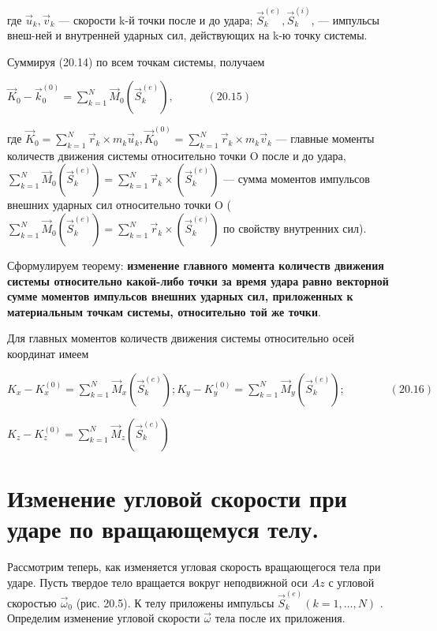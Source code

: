 {\begin{center}
\par где $\vec{u}_k, \vec{v}_k$  — скорости k-й точки после и до удара; $\vec{S}_k^{(e)}, \vec{S}_k^{(i)}$,  — импульсы внеш-ней и внутренней ударных сил, действующих на k-ю точку системы.

\par Суммируя (20.14) по всем точкам системы, получаем

\par $\vec{K}_0 - \vec{k}_0^{(0)} = \sum\limits_{k=1}^N \vec{M}_0 (\vec{S}_k^{(e)}), \quad\quad\quad (20.15)$

\par где $\vec{K}_0 = \sum\limits_{k=1}^N \vec{r}_k \times m_k \vec{u}_k, \vec{K}_0^{(0)} = \sum\limits_{k=1}^N \vec{r}_k \times m_k \vec{v}_k$ — главные моменты количеств движения системы  относительно  точки  O  после  и  до  удара, $\sum\limits_{k=1}^N \vec{M}_0 (\vec{S}_k^{(e)}) = \sum\limits_{k=1}^N \vec{r}_k \times (\vec{S}_k^{(e)})$ —  сумма  моментов  импульсов  внешних  ударных  сил  относительно  точки  O  ( $\sum\limits_{k=1}^N \vec{M}_0 (\vec{S}_k^{(e)}) = \sum\limits_{k=1}^N \vec{r}_k \times (\vec{S}_k^{(e)})$ по свойству внутренних сил).

\par Сформулируем теорему: \textbf{изменение главного момента количеств движения системы относительно какой-либо точки за время удара равно векторной сумме моментов импульсов внешних ударных сил, приложенных к материальным точкам системы, относительно той же точки}.

\par Для главных моментов количеств движения системы относительно осей координат имеем

\par $K_x - K_x^{(0)} = \sum\limits_{k=1}^N \vec{M}_x (\vec{S}_k^{(e)}); K_y - K_y^{(0)} = \sum\limits_{k=1}^N \vec{M}_y (\vec{S}_k^{(e)}); \quad\quad\quad\quad (20.16)$ 

\par $K_z - K_z^{(0)} = \sum\limits_{k=1}^N \vec{M}_z (\vec{S}_k^{(e)})$

\end{center}
\section{Изменение угловой скорости при ударе по вращающемуся телу.}
\begin{center}

\par Рассмотрим теперь, как изменяется угловая скорость вращающегося тела при ударе. Пусть твердое тело вращается вокруг неподвижной оси $Az$ с угловой скоростью $\vec{\omega}_0$ (рис. 20.5). К телу приложены импульсы $\vec{S}_k^{(e)} (k=1, \dots, N)$  .  Определим  изменение угловой скорости $\vec{\omega}$ тела после их приложения.


\end{center}}

